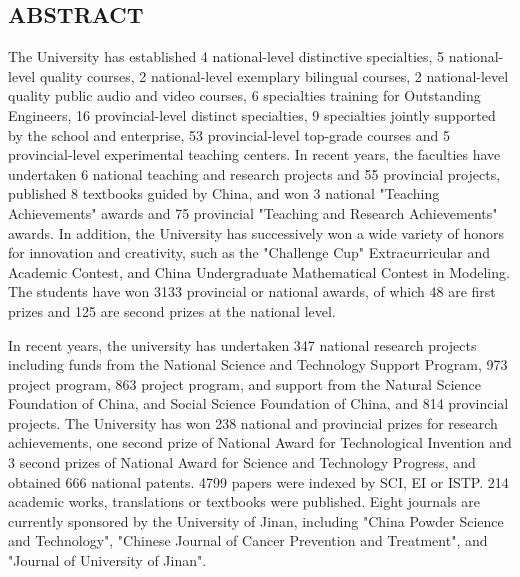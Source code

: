 \begin{ujnabstract*}
\chapter{ABSTRACT}
The University has established 4 national-level distinctive specialties, 5 national-level quality courses, 2 national-level exemplary bilingual courses, 2 national-level quality public audio and video courses, 6 specialties training for Outstanding Engineers, 16 provincial-level distinct specialties, 9 specialties jointly supported by the school and enterprise, 53 provincial-level top-grade courses and 5 provincial-level experimental teaching centers. In recent years, the faculties have undertaken 6 national teaching and research projects and 55 provincial projects, published 8 textbooks guided by China, and won 3 national "Teaching Achievements" awards and 75 provincial "Teaching and Research Achievements" awards. In addition, the University has successively won a wide variety of honors for innovation and creativity, such as the "Challenge Cup" Extracurricular and Academic Contest, and China Undergraduate Mathematical Contest in Modeling. The students have won 3133 provincial or national awards, of which 48 are first prizes and 125 are second prizes at the national level.

In recent years, the university has undertaken 347 national research projects including funds from the National Science and Technology Support Program, 973 project program, 863 project program, and support from the Natural Science Foundation of China, and Social Science Foundation of China, and 814 provincial projects. The University has won 238 national and provincial prizes for research achievements, one second prize of National Award for Technological Invention and 3 second prizes of National Award for Science and Technology Progress, and obtained 666 national patents. 4799 papers were indexed by SCI, EI or ISTP. 214 academic works, translations or textbooks were published. Eight journals are currently sponsored by the University of Jinan, including "China Powder Science and Technology", "Chinese Journal of Cancer Prevention and Treatment", and "Journal of University of Jinan".
\end{ujnabstract*}
